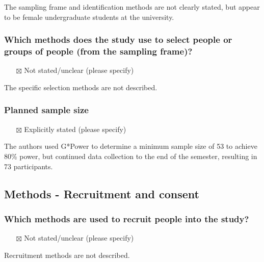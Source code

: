 \documentclass[
  doc, a4paper]{apa7}
\providecommand{\tightlist}{%
  \setlength{\itemsep}{0pt}\setlength{\parskip}{0pt}}
\begin{document}
The sampling frame and identification methods are not clearly stated, but appear to be female undergraduate students at the university.

\subsubsection{Which methods does the study use to select people or groups of people (from the sampling frame)?}\label{which-methods-does-the-study-use-to-select-people-or-groups-of-people-from-the-sampling-frame}

\begin{itemize}
\tightlist
\item[$\boxtimes$]
  Not stated/unclear (please specify)
\end{itemize}

The specific selection methods are not described.

\subsubsection{Planned sample size}\label{planned-sample-size}

\begin{itemize}
\tightlist
\item[$\boxtimes$]
  Explicitly stated (please specify)
\end{itemize}

The authors used G*Power to determine a minimum sample size of 53 to achieve 80\% power, but continued data collection to the end of the semester, resulting in 73 participants.

\subsection{Methods - Recruitment and consent}\label{methods---recruitment-and-consent}

\subsubsection{Which methods are used to recruit people into the study?}\label{which-methods-are-used-to-recruit-people-into-the-study}

\begin{itemize}
\tightlist
\item[$\boxtimes$]
  Not stated/unclear (please specify)
\end{itemize}

Recruitment methods are not described.
\end{document}

